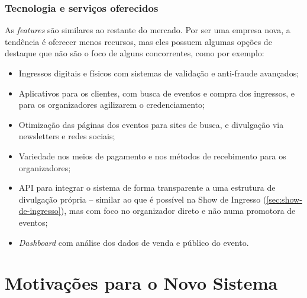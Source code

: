 \documentclass[12pt,a4paper,twoside,hyphens,english,brazil]{abntex2}
\begin{document}
\subsubsection*{Tecnologia e serviços oferecidos}
As \emph{features} são similares ao restante do mercado. Por ser uma empresa nova, a tendência é oferecer menos recursos, mas eles possuem algumas opções de destaque que não são o foco de alguns concorrentes, como por exemplo:
\begin{itemize}[itemsep=-1ex]
	\item Ingressos digitais e físicos com sistemas de validação e anti-fraude avançados;
	\item Aplicativos para os clientes, com busca de eventos e compra dos ingressos, e para os organizadores agilizarem o credenciamento;
	\item Otimização das páginas dos eventos para sites de busca, e divulgação via newsletters e redes sociais;
	\item Variedade nos meios de pagamento e nos métodos de recebimento para os organizadores;
	\item API para integrar o sistema de forma transparente a uma estrutura de divulgação própria -- similar ao que é possível na Show de Ingresso (\autoref{sec:show-de-ingresso}), mas com foco no organizador direto e não numa promotora de eventos;
	\item \emph{Dashboard} com análise dos dados de venda e público do evento.
\end{itemize}




\section{Motivações para o Novo Sistema}
\end{document}
